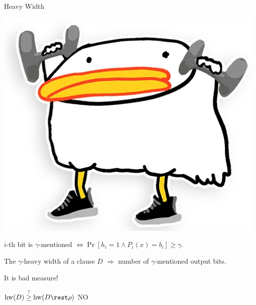 \begin{frame}{Heavy Width}

    \begin{center}
        \includegraphics[scale = 0.12]{pics/utia-lift.png}        
    \end{center}

    \vspace{0.3cm}

    $i$-th bit is $\gamma$-mentioned $\Leftrightarrow \Pr[h_i = 1 \land P_i(x) = b_i] \ge \gamma$.

    \begin{definition}
        The $\gamma$-heavy width of a clause $D$ $\Rightarrow$ number of $\gamma$-mentioned output bits.
    \end{definition}

    \pause
    \vspace{-1.5cm}
    \begin{minipage}[t][4cm][t]{0.5\linewidth}
        It is bad measure!
        
        \pause
        \vspace{0.2cm}
        $\mathrm{hw}(D) \stackrel{?}{\ge} \mathrm{hw}(D \rest \rho)$ \pause \hspace{0.4cm} \alert{NO}        
    \end{minipage}
    \pause
    \begin{minipage}[c][4cm][c]{0.45\linewidth}
        \vspace{2cm}
        \centering
                
    \end{minipage}

\end{frame}


